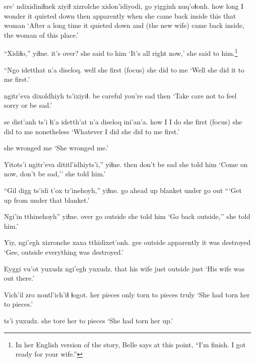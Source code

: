 \documentclass[12pt]{article}
\begin{document}
 sre' ndixidiniɬnek xiyiɬ xizrolche xidon'idiyodi, go yigginh nuq'oɬonh.  
{how long} {I wonder} {it quieted down} then apparently {when she came back inside} this that woman
\glt `After a long time it quieted down and (the new wife) came back inside, the woman of this place.' 
\glend

\gll ``Xidiɬo,'' yiɬne.  
{it's over?} {she said to him}
\glt `It's all right now,' she said to him.\footnote{In her English version of the story, Belle says at this point, ``I'm finish. I got ready for your wife.''}
\glend

\gll ``Ngo idetthat n'a diseloq. 
well {she first} {(focus)} {she did to me}
\glt `Well she did it to me first.' 
\glend

 {ngitr'eva dixoldhiyh} ts'ixiyiɬ. 
{be careful} {you're sad} then
\glt `Take care not to feel sorry or be sad.' 
\glend

 se dist'anh ts'i ɬi'a idetth'at n'a diseloq ini'an'a. 
how  I {I do} {} {} {she first} {(focus)} {she did to me} {nonetheless}
\glt `Whatever I did she did to me first.' 
\glend

{{she wronged me}}
\glt `She wronged me.' 
\glend

\gll Yitots'i {ngitr'eva dititl'idhiyts'i},'' yiɬne. 
then   {don't be sad} {she told him}
\glt `Come on now, don't be sad,'' she told him.' 
\glend

\gll ``Gil digg ts'idi t'ox tr'inehoyh,'' yiɬne. 
{go ahead} up blanket under {go out}
\glt ```Get up from under that blanket.'
\glend

\gll Ngi'in tthinehoyh'' yiɬne. 
over {go outside} {she told him}
\glt `Go back outside,'' she told him.'
\glend

\gll Yiy, ngi'egh xizronche {xaxa tthidixet'onh.}
gee outside apparently {it was destroyed}
\glt `Gee, outside everything was destroyed.' 
\glend

\gll Eyggi vu'ot yuxudz ngi'egh yuxudz.
that {his wife} just outside  just
\glt `His wife was out there.' 
\glend

\gll Vich'il zro nontl'ich'iɬ ɬogot. 
{her pieces} only {torn to pieces} truly
\glt `She had torn her to pieces.' 
\glend

 ts'i yuxudz. 
{she tore her to pieces} {}
\glt `She had torn her up.' 
\glend
\end{document}
